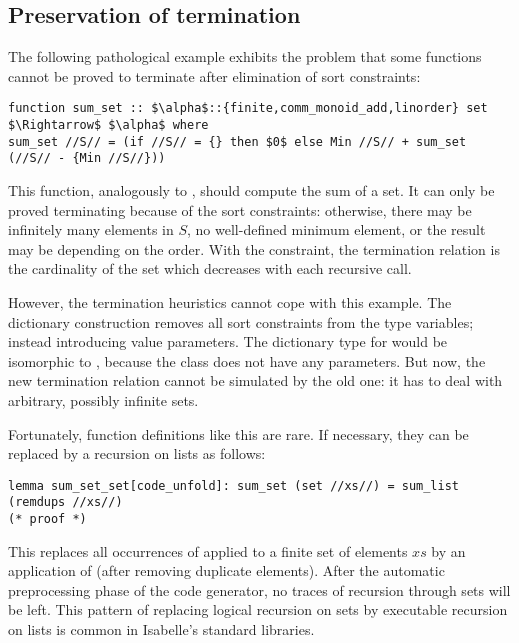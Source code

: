 \subsection{Preservation of termination}
The following pathological example exhibits the problem that some functions cannot be proved to terminate after elimination of sort constraints:
%
\begin{lstlisting}[language=Isabelle]
function sum_set :: $\alpha$::{finite,comm_monoid_add,linorder} set $\Rightarrow$ $\alpha$ where
sum_set //S// = (if //S// = {} then $0$ else Min //S// + sum_set (//S// - {Min //S//}))
\end{lstlisting}
%
This function, analogously to , should compute the sum of a set.
It can only be proved terminating because of the sort constraints:
otherwise, there may be infinitely many elements in $S$, no well-defined minimum element, or the result may be depending on the order.
With the constraint, the termination relation is the cardinality of the set which decreases with each recursive call.

However, the termination heuristics cannot cope with this example.
The dictionary construction removes all sort constraints from the type variables; instead introducing value parameters.
The dictionary type for  would be isomorphic to , because the class does not have any parameters.
But now, the new termination relation cannot be simulated by the old one:
it has to deal with arbitrary, possibly infinite sets.

Fortunately, function definitions like this are rare.
If necessary, they can be replaced by a recursion on lists as follows:
%
\begin{lstlisting}[language=Isabelle]
lemma sum_set_set[code_unfold]: sum_set (set //xs//) = sum_list (remdups //xs//)
(* proof *)
\end{lstlisting}
%
This replaces all occurrences of  applied to a finite set of elements $\mathit{xs}$ by an application of  (after removing duplicate elements).
After the automatic preprocessing phase of the code generator, no traces of recursion through sets will be left.
This pattern of replacing logical recursion on sets by executable recursion on lists is common in Isabelle's standard libraries.


